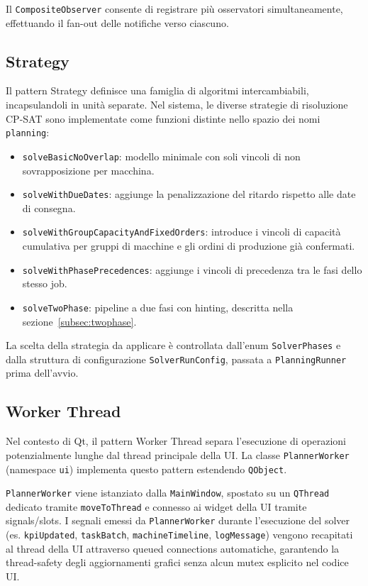 Il \texttt{CompositeObserver} consente di registrare più osservatori simultaneamente, effettuando il fan-out delle notifiche verso ciascuno.

\subsection{Strategy}
\label{subsec:strategy}

Il pattern Strategy definisce una famiglia di algoritmi intercambiabili, incapsulandoli in unità separate. Nel sistema, le diverse strategie di risoluzione CP-SAT sono implementate come funzioni distinte nello spazio dei nomi \texttt{planning}:

\begin{itemize}
    \item \texttt{solveBasicNoOverlap}: modello minimale con soli vincoli di non sovrapposizione per macchina.
    \item \texttt{solveWithDueDates}: aggiunge la penalizzazione del ritardo rispetto alle date di consegna.
    \item \texttt{solveWithGroupCapacityAndFixedOrders}: introduce i vincoli di capacità cumulativa per gruppi di macchine e gli ordini di produzione già confermati.
    \item \texttt{solveWithPhasePrecedences}: aggiunge i vincoli di precedenza tra le fasi dello stesso job.
    \item \texttt{solveTwoPhase}: pipeline a due fasi con hinting, descritta nella sezione~\ref{subsec:twophase}.
\end{itemize}

La scelta della strategia da applicare è controllata dall'enum \texttt{SolverPhases} e dalla struttura di configurazione \texttt{SolverRunConfig}, passata a \texttt{PlanningRunner} prima dell'avvio.

\subsection{Worker Thread}
\label{subsec:worker}

Nel contesto di Qt, il pattern Worker Thread separa l'esecuzione di operazioni potenzialmente lunghe dal thread principale della UI. La classe \texttt{PlannerWorker} (namespace \texttt{ui}) implementa questo pattern estendendo \texttt{QObject}.

\texttt{PlannerWorker} viene istanziato dalla \texttt{MainWindow}, spostato su un \texttt{QThread} dedicato tramite \texttt{moveToThread} e connesso ai widget della UI tramite signals/slots. I segnali emessi da \texttt{PlannerWorker} durante l'esecuzione del solver (es. \texttt{kpiUpdated}, \texttt{taskBatch}, \texttt{machineTimeline}, \texttt{logMessage}) vengono recapitati al thread della UI attraverso queued connections automatiche, garantendo la thread-safety degli aggiornamenti grafici senza alcun mutex esplicito nel codice UI.

